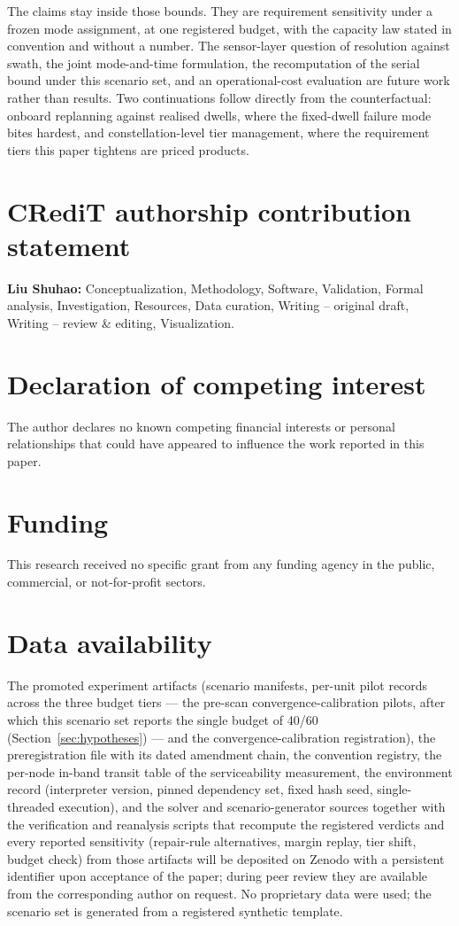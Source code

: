 \documentclass[preprint,authoryear]{elsarticle}
\begin{document}
The claims stay inside those bounds. They are requirement sensitivity under a frozen mode assignment, at one registered budget, with the capacity law stated in convention and without a number. The sensor-layer question of resolution against swath, the joint mode-and-time formulation, the recomputation of the serial bound under this scenario set, and an operational-cost evaluation are future work rather than results. Two continuations follow directly from the counterfactual: onboard replanning against realised dwells, where the fixed-dwell failure mode bites hardest, and constellation-level tier management, where the requirement tiers this paper tightens are priced products.

\section*{CRediT authorship contribution statement}
\textbf{Liu Shuhao:} Conceptualization, Methodology, Software, Validation, Formal analysis, Investigation, Resources, Data curation, Writing -- original draft, Writing -- review \& editing, Visualization.

\section*{Declaration of competing interest}
The author declares no known competing financial interests or personal relationships that could have appeared to influence the work reported in this paper.

\section*{Funding}
This research received no specific grant from any funding agency in the public, commercial, or not-for-profit sectors.

\section*{Data availability}
The promoted experiment artifacts (scenario manifests, per-unit pilot records across the three budget tiers --- the pre-scan convergence-calibration pilots, after which this scenario set reports the single budget of 40/60 (Section~\ref{sec:hypotheses}) --- and the convergence-calibration registration), the preregistration file with its dated amendment chain, the convention registry, the per-node in-band transit table of the serviceability measurement, the environment record (interpreter version, pinned dependency set, fixed hash seed, single-threaded execution), and the solver and scenario-generator sources together with the verification and reanalysis scripts that recompute the registered verdicts and every reported sensitivity (repair-rule alternatives, margin replay, tier shift, budget check) from those artifacts will be deposited on Zenodo with a persistent identifier upon acceptance of the paper; during peer review they are available from the corresponding author on request. No proprietary data were used; the scenario set is generated from a registered synthetic template.


\end{document}
